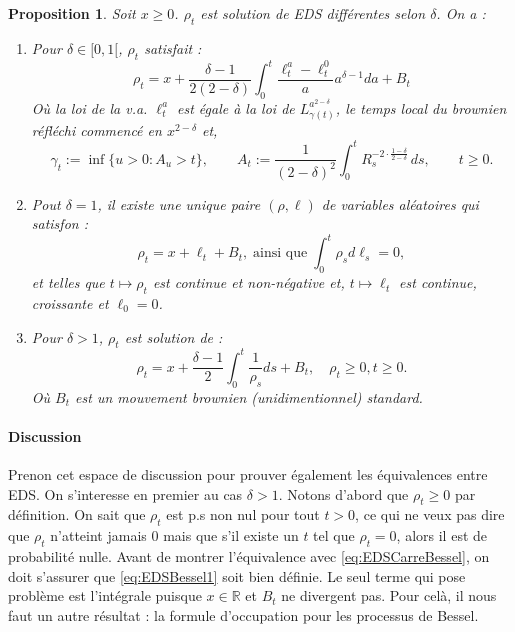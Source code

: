 \documentclass[openany]{book}
\newcommand{\R}{\mathbb{R}}
\newcommand{\1}{\mathbbm{1}}
\theoremstyle{thmfont}
\theoremstyle{deffont}
\theoremstyle{thmfont}
\newtheorem{prop}[prop]{Proposition}
\theoremstyle{deffont}
\begin{document}
\newpage

\begin{prop} Soit $x \geq 0$. $\rho_t$ est solution de EDS différentes selon $\delta$. On a :
  \begin{enumerate}
    \item Pour $\delta \in [0,1[$, $\rho_t$ satisfait :
     \begin{equation}
       \rho_t = x + \dfrac{\delta-1}{2(2-\delta)}\int_0^t \dfrac{\ell_t^a- \ell_t^0}{a}a^{\delta-1} da + B_t
       \label{eq:EDSBessel3}
     \end{equation}
     Où la loi de la v.a. $\ell_t^a$ est égale à la loi de $L_{\gamma(t)}^{a^{2-\delta}}$, le temps local du brownien réfléchi commencé en $x^{2-\delta}$ et,
     $$\gamma_t := \inf\{u > 0 : A_u > t\}, \qquad
     A_t := \frac{1}{(2 - \delta)^2} \int_0^t R_s^{-2 \cdot \frac{1 - \delta}{2 - \delta}} \, ds, \qquad t \geq 0.$$
   \item Pout $\delta =1$, il existe une unique paire $(\rho, \ell)$ de variables aléatoires qui satisfon :
     \begin{equation}
       \rho_t = x + \ell_t + B_t, \;\text{ainsi que}\; \int_0^t \rho_s d\ell_s = 0,
       \label{eq:EDSBessel2}
     \end{equation}
     et telles que $t\mapsto \rho_t$ est continue et non-négative et, $t \mapsto \ell_t$ est continue, croissante et $\ell_0 = 0$.\\
   \item Pour $\delta > 1$, $\rho_t$ est solution de :
     \begin{equation}
       \rho_t = x + \dfrac{\delta-1}{2}\int_0^t \dfrac{1}{\rho_s} ds + B_t, \quad \rho_t \geq 0, t \geq 0.
       \label{eq:EDSBessel1}
     \end{equation}
     Où $B_t$ est un mouvement brownien (unidimentionnel) standard.\\
\end{enumerate}
\end{prop}

\paragraph{Discussion} Prenon cet espace de discussion pour prouver également les équivalences entre EDS.
On s'interesse en premier au cas $\delta >1$. Notons d'abord que $\rho_t \geq 0$ par définition. On sait que $\rho_t$ est p.s non nul pour tout $t >0$, ce qui ne veux pas dire que $\rho_t$ n'atteint jamais 0 mais que s'il existe un $t$ tel que $\rho_t = 0$, alors il est de probabilité nulle. Avant de montrer l'équivalence avec \eqref{eq:EDSCarreBessel}, on doit s'assurer que \eqref{eq:EDSBessel1} soit bien définie. Le seul terme qui pose problème est l'intégrale puisque $x \in \R$ et $B_t$ ne divergent pas. Pour celà, il nous faut un autre résultat : la formule d'occupation pour les processus de Bessel.
\end{document}
